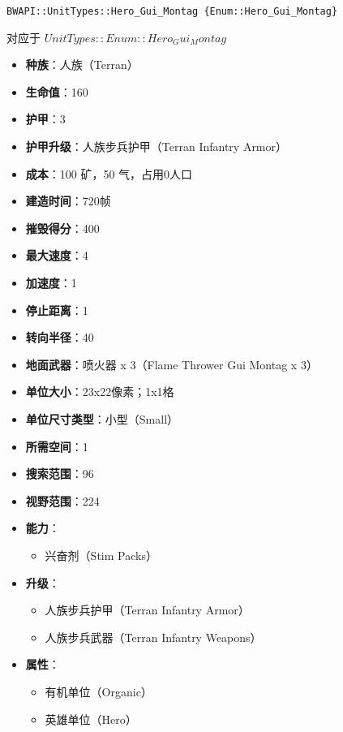 \begin{tcolorbox}[colback=white, colframe=black!60!white, title=Hero\_Gui\_Montag(), arc=0mm]
    \begin{verbatim}
BWAPI::UnitTypes::Hero_Gui_Montag {Enum::Hero_Gui_Montag}
    \end{verbatim}
    对应于  $ UnitTypes::Enum::Hero_Gui_Montag $ 
    \begin{itemize}
        \item \textbf{种族}：人族（Terran）
        \item \textbf{生命值}：160
        \item \textbf{护甲}：3
        \item \textbf{护甲升级}：人族步兵护甲（Terran Infantry Armor）
        \item \textbf{成本}：100 矿，50 气，占用0人口
        \item \textbf{建造时间}：720帧
        \item \textbf{摧毁得分}：400
        \item \textbf{最大速度}：4
        \item \textbf{加速度}：1
        \item \textbf{停止距离}：1
        \item \textbf{转向半径}：40
        \item \textbf{地面武器}：喷火器 x 3（Flame Thrower Gui Montag x 3）
        \item \textbf{单位大小}：23x22像素；1x1格
        \item \textbf{单位尺寸类型}：小型（Small）
        \item \textbf{所需空间}：1
        \item \textbf{搜索范围}：96
        \item \textbf{视野范围}：224
        \item \textbf{能力}：
            \begin{itemize}
                \item 兴奋剂（Stim Packs）
            \end{itemize}
        \item \textbf{升级}：
            \begin{itemize}
                \item 人族步兵护甲（Terran Infantry Armor）
                \item 人族步兵武器（Terran Infantry Weapons）
            \end{itemize}
        \item \textbf{属性}：
            \begin{itemize}
                \item 有机单位（Organic）
                \item 英雄单位（Hero）
            \end{itemize}
    \end{itemize}
    
\end{tcolorbox}

